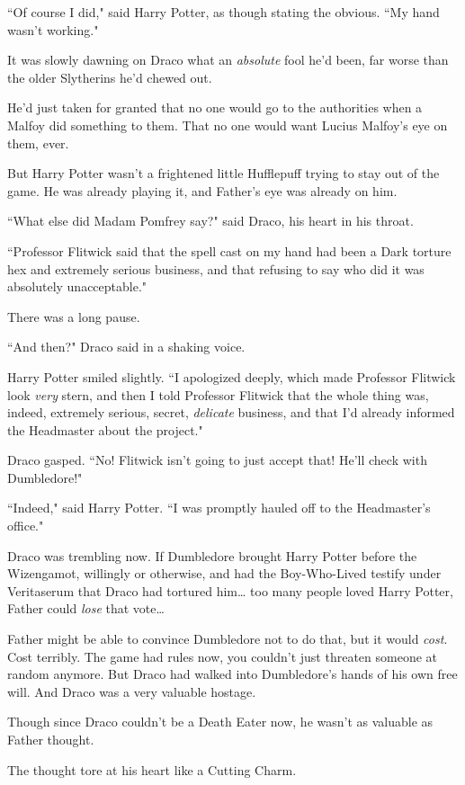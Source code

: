 ``Of course I did," said Harry Potter, as though stating the obvious. ``My hand wasn't working."

It was slowly dawning on Draco what an \emph{absolute} fool he'd been, far worse than the older Slytherins he'd chewed out.

He'd just taken for granted that no one would go to the authorities when a Malfoy did something to them. That no one would want Lucius Malfoy's eye on them, ever.

But Harry Potter wasn't a frightened little Hufflepuff trying to stay out of the game. He was already playing it, and Father's eye was already on him.

``What else did Madam Pomfrey say?" said Draco, his heart in his throat.

``Professor Flitwick said that the spell cast on my hand had been a Dark torture hex and extremely serious business, and that refusing to say who did it was absolutely unacceptable."

There was a long pause.

``And then?" Draco said in a shaking voice.

Harry Potter smiled slightly. ``I apologized deeply, which made Professor Flitwick look \emph{very} stern, and then I told Professor Flitwick that the whole thing was, indeed, extremely serious, secret, \emph{delicate} business, and that I'd already informed the Headmaster about the project."

Draco gasped. ``No! Flitwick isn't going to just accept that! He'll check with Dumbledore!"

``Indeed," said Harry Potter. ``I was promptly hauled off to the Headmaster's office."

Draco was trembling now. If Dumbledore brought Harry Potter before the Wizengamot, willingly or otherwise, and had the Boy-Who-Lived testify under Veritaserum that Draco had tortured him{\ldots} too many people loved Harry Potter, Father could \emph{lose} that vote{\ldots}

Father might be able to convince Dumbledore not to do that, but it would \emph{cost}. Cost terribly. The game had rules now, you couldn't just threaten someone at random anymore. But Draco had walked into Dumbledore's hands of his own free will. And Draco was a very valuable hostage.

Though since Draco couldn't be a Death Eater now, he wasn't as valuable as Father thought.

The thought tore at his heart like a Cutting Charm.

